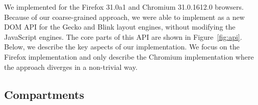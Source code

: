 We implemented \sys{} for the Firefox 31.0a1 and Chromium 31.0.1612.0
browsers.
%
Because of our coarse-grained approach,
we were able to implement \sys{} as a new DOM API for the Gecko and
Blink layout engines, without modifying the JavaScript engines.
%
The core parts of this API are shown in Figure~\ref{fig:api}.
%
Below, we describe the key aspects of our implementation.
%
We focus on the Firefox
implementation and only describe the Chromium implementation where the
approach diverges in a non-trivial way.
%

\subsection{Compartments}
\begin{table}
\caption{Confining code from exfiltrating data using existing browser
mechanisms.}
\label{tab:comm}
\end{table}
 
